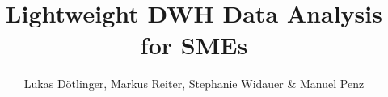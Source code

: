 \usepackage{lmodern}
\usepackage[english]{babel}

\usepackage{fontspec}

\usepackage{multicol}

\usepackage{listings}

\usepackage{graphicx}
\graphicspath{{assets/}}

\title{Lightweight DWH Data Analysis for SMEs}
\author{Lukas Dötlinger, Markus Reiter, Stephanie Widauer \& Manuel Penz}
